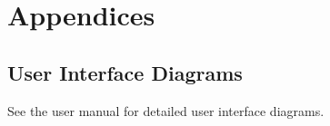 \documentclass[11pt]{article}
\begin{document}
\section{Appendices}
\label{sec-4}
\subsection{User Interface Diagrams}
\label{sec-4-1}

See the user manual for detailed user interface diagrams.
\end{document}
